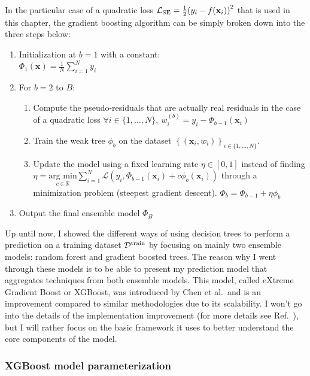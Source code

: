 \documentclass[main]{subfiles}
\begin{document}
In the particular case of a quadratic loss $\mathcal{L}_{\text{SE}} =\tfrac{1}{2} {\left(y_i - f(\mathbf{x}_i)\right)}^2$ that is used in this chapter, the gradient boosting algorithm can be simply broken down into the three steps below:\autocite{Friedman2002}
\begin{enumerate}
  \item Initialization at $b=1$ with a constant: \\
    \quad $\Phi_1(\mathbf{x}) = \frac{1}{N}\sum_{i=1}^{N}y_i$
  \item For $b = 2$ to $B$:
    \begin{enumerate}
      \item Compute the pseudo-residuals that are actually real residuals in the case of a quadratic loss
        \quad $\forall i\in \{1,\ldots,N\},\ w_i^{(b)} = y_i - \Phi_{b-1}(\mathbf{x}_i)$
      \item Train the weak tree $\phi_b$ on the dataset ${\left\{ (\mathbf{x}_i, w_i) \right\}}_{i\in \{1,\ldots,N\}}$.
      \item Update the model using a fixed learning rate $\eta\in [0,1]$ instead of finding $\eta =\underset{c\in \mathbb{R}}{\text{arg min}} \sum_{i=1}^{N}\mathcal{L}\left(y_i,\Phi_{b-1}(\mathbf{x}_i) + c \phi_b(\mathbf{x}_i)\right)$ through a minimization problem (steepest gradient descent).
        \quad $\Phi_b = \Phi_{b-1} + \eta \phi_{b}$
    \end{enumerate}
  \item Output the final ensemble model $\Phi_B$
\end{enumerate}

Up until now, I showed the different ways of using decision trees to perform a prediction on a training dataset $\mathcal{D}^{\text{train}}$ by focusing on mainly two ensemble models: random forest and gradient boosted trees. The reason why I went through these models is to be able to present my prediction model that aggregates techniques from both ensemble models. This model, called eXtreme Gradient Boost or XGBoost, was introduced by Chen et al.\ and is an improvement compared to similar methodologies due to its scalability. I won't go into the details of the implementation improvement (for more details see Ref.~\cite{chen2016xgboost}), but I will rather focus on the basic framework it uses to better understand the core components of the model.

\subsubsection{XGBoost model parameterization}
\end{document}
